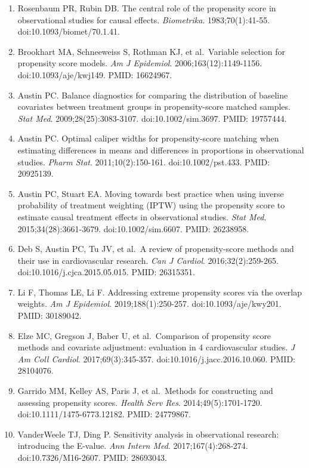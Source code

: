 \documentclass[
  chinese-hans,
  letterpaper,
  DIV=11,
  numbers=noendperiod]{scrreprt}
\providecommand{\tightlist}{%
  \setlength{\itemsep}{0pt}\setlength{\parskip}{0pt}}
\begin{document}
\begin{enumerate}
\def\labelenumi{\arabic{enumi}.}
\tightlist
\item
  Rosenbaum PR, Rubin DB. The central role of the propensity score in
  observational studies for causal effects. \emph{Biometrika}.
  1983;70(1):41-55. doi:10.1093/biomet/70.1.41.
\item
  Brookhart MA, Schneeweiss S, Rothman KJ, et al.~Variable selection for
  propensity score models. \emph{Am J Epidemiol}.
  2006;163(12):1149-1156. doi:10.1093/aje/kwj149. PMID: 16624967.
\item
  Austin PC. Balance diagnostics for comparing the distribution of
  baseline covariates between treatment groups in propensity-score
  matched samples. \emph{Stat Med}. 2009;28(25):3083-3107.
  doi:10.1002/sim.3697. PMID: 19757444.
\item
  Austin PC. Optimal caliper widths for propensity-score matching when
  estimating differences in means and differences in proportions in
  observational studies. \emph{Pharm Stat}. 2011;10(2):150-161.
  doi:10.1002/pst.433. PMID: 20925139.
\item
  Austin PC, Stuart EA. Moving towards best practice when using inverse
  probability of treatment weighting (IPTW) using the propensity score
  to estimate causal treatment effects in observational studies.
  \emph{Stat Med}. 2015;34(28):3661-3679. doi:10.1002/sim.6607. PMID:
  26238958.
\item
  Deb S, Austin PC, Tu JV, et al.~A review of propensity-score methods
  and their use in cardiovascular research. \emph{Can J Cardiol}.
  2016;32(2):259-265. doi:10.1016/j.cjca.2015.05.015. PMID: 26315351.
\item
  Li F, Thomas LE, Li F. Addressing extreme propensity scores via the
  overlap weights. \emph{Am J Epidemiol}. 2019;188(1):250-257.
  doi:10.1093/aje/kwy201. PMID: 30189042.
\item
  Elze MC, Gregson J, Baber U, et al.~Comparison of propensity score
  methods and covariate adjustment: evaluation in 4 cardiovascular
  studies. \emph{J Am Coll Cardiol}. 2017;69(3):345-357.
  doi:10.1016/j.jacc.2016.10.060. PMID: 28104076.
\item
  Garrido MM, Kelley AS, Paris J, et al.~Methods for constructing and
  assessing propensity scores. \emph{Health Serv Res}.
  2014;49(5):1701-1720. doi:10.1111/1475-6773.12182. PMID: 24779867.
\item
  VanderWeele TJ, Ding P. Sensitivity analysis in observational
  research: introducing the E-value. \emph{Ann Intern Med}.
  2017;167(4):268-274. doi:10.7326/M16-2607. PMID: 28693043.
\end{enumerate}
\end{document}
